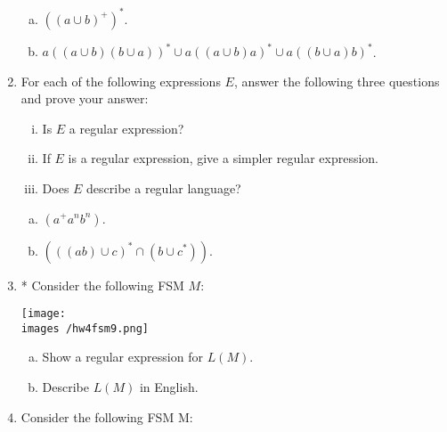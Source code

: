 \documentclass[10pt]{article}
\newcommand{\images}{/home/gparker/classes/341/images}
\begin{document}
\begin{enumerate}[1)]
\begin{enumerate}[a)]
\item
$((a \cup b)^+)^*$.

\item
$a ( (a \cup b)(b \cup a) )^* \cup a ( (a \cup b) a )^* \cup a ( (b \cup a) b )^*$.
\end{enumerate}

\item
For each of the following expressions $E$, answer the following three questions and prove your answer:
\begin{center}
\begin{enumerate}[(i)]
\item
Is $E$ a regular expression?

\item
If $E$ is a regular expression, give a simpler regular expression.

\item
Does $E$ describe a regular language?
\end{enumerate}
\end{center}

\begin{enumerate}[a)]
\addtocounter{enumii}{1}
\item
$(a^+a^nb^n)$.

\addtocounter{enumii}{1}
\item
$(((ab) \cup c)^* \cap (b \cup c^*))$.
\end{enumerate}

\addtocounter{enumi}{4}

\item
* Consider the following FSM $M$:
\begin{center}
\texttt{[image: \\images /hw4fsm9.png]}
\end{center}

\begin{enumerate}[a)]
\item
Show a regular expression for $L(M)$.

\item
Describe $L(M)$ in English.
\end{enumerate}

\addtocounter{enumi}{5}
\item
Consider the following FSM M:

\begin{center}
\end{center}


\end{enumerate}
\end{document}
